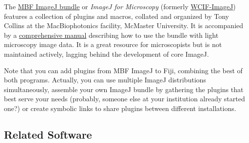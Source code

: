 The \href{http://www.macbiophotonics.ca/imagej/}{MBF ImageJ bundle}
or \emph{ImageJ for Microscopy} (formerly \href{http://www.uhnres.utoronto.ca/facilities/wcif/imagej/}{WCIF-ImageJ})
features a collection of plugins and macros, collated and organized
by Tony Collins at the MacBiophotonics facility, McMaster University.
It is accompanied by a \href{http://www.macbiophotonics.ca/imagej/}{comprehensive manual}
describing how to use the bundle with light microscopy image data.
It is a great resource for microscopists but is not maintained actively,
lagging behind the development of core ImageJ.

Note that you can add plugins from MBF ImageJ to Fiji, combining the
best of both programs. Actually, you can use multiple ImageJ distributions
simultaneously, assemble your own ImageJ bundle by gathering the plugins
that best serve your needs (probably, someone else at your institution
already started one?) or create symbolic links to share plugins between
different installations.




\subsection{Related Software\label{sub:Related-Software}}


